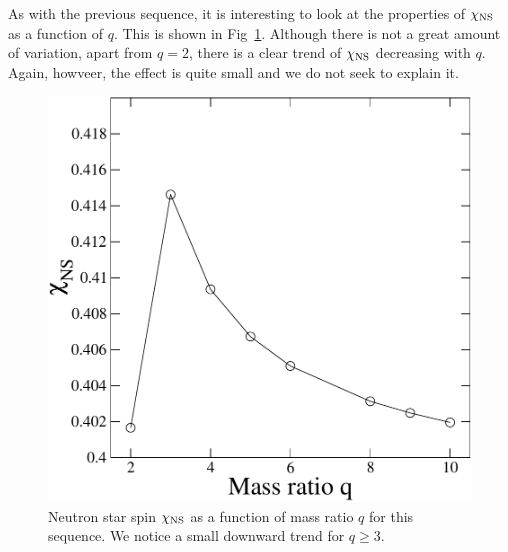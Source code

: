 As with the previous sequence, it is interesting to look at the
properties of $\chi_{\rm NS}$ as a function of $q$. This is shown in
Fig~\ref{fig:qchi}. Although there is not a great amount of variation,
apart from $q=2$, there is a clear trend of
$\chi_{\rm NS}$ decreasing with $q$. Again, howveer, the effect is quite small and we do not seek to explain it.
\begin{figure}
\includegraphics[width=0.95\columnwidth]{chap4/qchi}
\caption[$\chi_{\rm NS}$ as a function of mass ratio $q$.]{\label{fig:qchi}Neutron star spin $\chi_{\rm
    NS}$ as a function of mass ratio $q$ for this sequence. We notice
  a small downward trend for $q \geq 3$.}
\end{figure}




